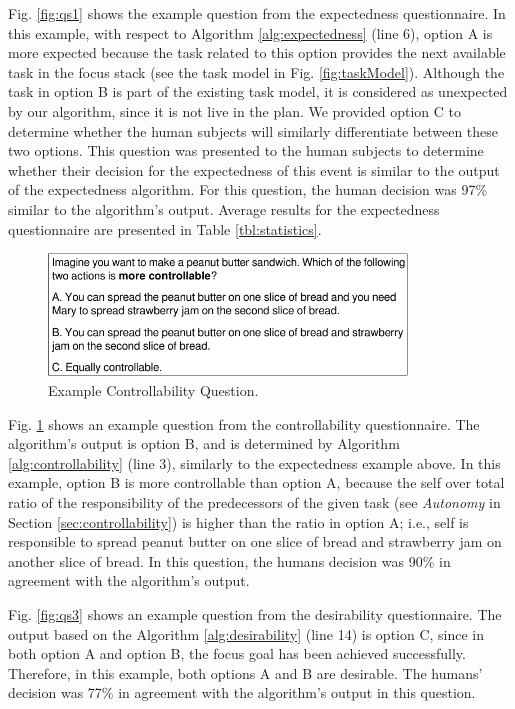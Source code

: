 \documentclass[12pt]{report}
\begin{document}
Fig. \ref{fig:qs1} shows the example question from the expectedness
questionnaire. In this example, with respect to Algorithm
\ref{alg:expectedness} (line 6), option A is more expected because the task
related to this option provides the next available task in the focus stack (see
the task model in Fig. \ref{fig:taskModel}). Although the task in option B is
part of the existing task model, it is considered as unexpected by our
algorithm, since it is not live in the plan. We provided option C to determine
whether the human subjects will similarly differentiate between these two
options. This question was presented to the human subjects to determine whether
their decision for the expectedness of this event is similar to the output of
the expectedness algorithm. For this question, the human decision was 97\%
similar to the algorithm's output. Average results for the expectedness
questionnaire are presented in Table \ref{tbl:statistics}.

\begin{figure}[tbh]
  \centering
  \includegraphics[width=0.85\textwidth]{figure/question-sample2-croped.pdf}
  \caption{{\fontsize{9}{9}\selectfont Example Controllability Question.}}
  \label{fig:qs2}
  \vspace{-5mm}
\end{figure}

Fig. \ref{fig:qs2} shows an example question from the controllability
questionnaire. The algorithm's output is option B, and is determined by
Algorithm \ref{alg:controllability} (line 3), similarly to the expectedness
example above. In this example, option B is more controllable than option A,
because the self over total ratio of the responsibility of the predecessors of
the given task (see \textit{Autonomy} in Section \ref{sec:controllability}) is
higher than the ratio in option A; i.e., self is responsible to spread peanut
butter on one slice of bread and strawberry jam on another slice of bread. In
this question, the humans decision was 90\% in agreement with the algorithm's
output.

Fig. \ref{fig:qs3} shows an example question from the desirability
questionnaire. The output based on the Algorithm \ref{alg:desirability}
(line 14) is option C, since in both option A and option B, the focus goal
has been achieved successfully. Therefore, in this example, both options A and B
are desirable. The humans' decision was 77\% in agreement with the algorithm's
output in this question.
\end{document}
